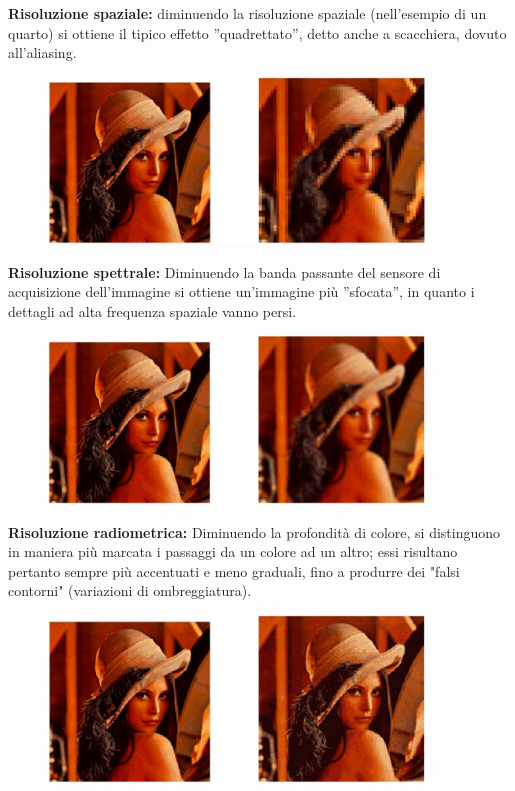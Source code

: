 \begin{trivlist}
    \item \textbf{Risoluzione spaziale:} diminuendo la risoluzione spaziale
    (nell'esempio di un quarto) si ottiene il tipico effetto ”quadrettato”,
    detto anche a scacchiera, dovuto all'aliasing.
    \begin{figure}[H]
        \centering
        \includegraphics[width=10cm, keepaspectratio]{capitoli/immagini/imgs/esempio_risoluzione_spaziale.jpg}
    \end{figure}

    \item \textbf{Risoluzione spettrale:} Diminuendo la banda passante del
    sensore di acquisizione dell'immagine si ottiene un'immagine più ”sfocata”,
    in quanto i dettagli ad alta frequenza spaziale vanno persi.
    \begin{figure}[H]
        \centering
        \includegraphics[width=10cm, keepaspectratio]{capitoli/immagini/imgs/esempio_risoluzione_spettrale.jpg}
    \end{figure}

    \item \textbf{Risoluzione radiometrica:} Diminuendo la profondità di colore,
    si distinguono in maniera più marcata i passaggi da un colore ad un altro;
    essi risultano pertanto sempre più accentuati e meno graduali, fino a
    produrre dei "falsi contorni" (variazioni di ombreggiatura).
    \begin{figure}[H]
        \centering
        \includegraphics[width=10cm, keepaspectratio]{capitoli/immagini/imgs/esempio_risoluzione_radiometrica.jpg}
    \end{figure}
\end{trivlist}

